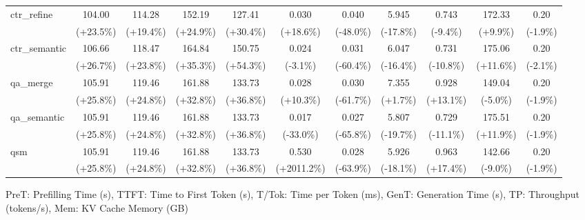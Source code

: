\begin{table}[t]
{\begin{tabular}{l|cccccccccc}
    ctr\_refine & 104.00 & 114.28 & 152.19 & 127.41 & 0.030 & 0.040 & 5.945 & 0.743 & 172.33 & 0.20 \\
     & {\tiny\color{red!70!black}(+23.5\%)} & {\tiny\color{red!70!black}(+19.4\%)} & {\tiny\color{red!70!black}(+24.9\%)} & {\tiny\color{red!70!black}(+30.4\%)} & {\tiny\color{red!70!black}(+18.6\%)} & {\tiny\color{green!60!black}(-48.0\%)} & {\tiny\color{green!60!black}(-17.8\%)} & {\tiny\color{green!60!black}(-9.4\%)} & {\tiny\color{green!60!black}(+9.9\%)} & {\tiny\color{green!60!black}(-1.9\%)} \\
    ctr\_semantic & 106.66 & 118.47 & 164.84 & 150.75 & 0.024 & 0.031 & 6.047 & 0.731 & 175.06 & 0.20 \\
     & {\tiny\color{red!70!black}(+26.7\%)} & {\tiny\color{red!70!black}(+23.8\%)} & {\tiny\color{red!70!black}(+35.3\%)} & {\tiny\color{red!70!black}(+54.3\%)} & {\tiny\color{green!60!black}(-3.1\%)} & {\tiny\color{green!60!black}(-60.4\%)} & {\tiny\color{green!60!black}(-16.4\%)} & {\tiny\color{green!60!black}(-10.8\%)} & {\tiny\color{green!60!black}(+11.6\%)} & {\tiny\color{green!60!black}(-2.1\%)} \\
    qa\_merge & 105.91 & 119.46 & 161.88 & 133.73 & 0.028 & 0.030 & 7.355 & 0.928 & 149.04 & 0.20 \\
     & {\tiny\color{red!70!black}(+25.8\%)} & {\tiny\color{red!70!black}(+24.8\%)} & {\tiny\color{red!70!black}(+32.8\%)} & {\tiny\color{red!70!black}(+36.8\%)} & {\tiny\color{red!70!black}(+10.3\%)} & {\tiny\color{green!60!black}(-61.7\%)} & {\tiny\color{red!70!black}(+1.7\%)} & {\tiny\color{red!70!black}(+13.1\%)} & {\tiny\color{red!70!black}(-5.0\%)} & {\tiny\color{green!60!black}(-1.9\%)} \\
    qa\_semantic & 105.91 & 119.46 & 161.88 & 133.73 & 0.017 & 0.027 & 5.807 & 0.729 & 175.51 & 0.20 \\
     & {\tiny\color{red!70!black}(+25.8\%)} & {\tiny\color{red!70!black}(+24.8\%)} & {\tiny\color{red!70!black}(+32.8\%)} & {\tiny\color{red!70!black}(+36.8\%)} & {\tiny\color{green!60!black}(-33.0\%)} & {\tiny\color{green!60!black}(-65.8\%)} & {\tiny\color{green!60!black}(-19.7\%)} & {\tiny\color{green!60!black}(-11.1\%)} & {\tiny\color{green!60!black}(+11.9\%)} & {\tiny\color{green!60!black}(-1.9\%)} \\
    qsm & 105.91 & 119.46 & 161.88 & 133.73 & 0.530 & 0.028 & 5.926 & 0.963 & 142.66 & 0.20 \\
     & {\tiny\color{red!70!black}(+25.8\%)} & {\tiny\color{red!70!black}(+24.8\%)} & {\tiny\color{red!70!black}(+32.8\%)} & {\tiny\color{red!70!black}(+36.8\%)} & {\tiny\color{red!70!black}(+2011.2\%)} & {\tiny\color{green!60!black}(-63.9\%)} & {\tiny\color{green!60!black}(-18.1\%)} & {\tiny\color{red!70!black}(+17.4\%)} & {\tiny\color{red!70!black}(-9.0\%)} & {\tiny\color{green!60!black}(-1.9\%)} \\
    \bottomrule
    \end{tabular}%
    }
    \vspace{0.1cm}
    \footnotesize{PreT: Prefilling Time (s), TTFT: Time to First Token (s), T/Tok: Time per Token (ms), GenT: Generation Time (s), TP: Throughput (tokens/s), Mem: KV Cache Memory (GB)}
\end{table}

